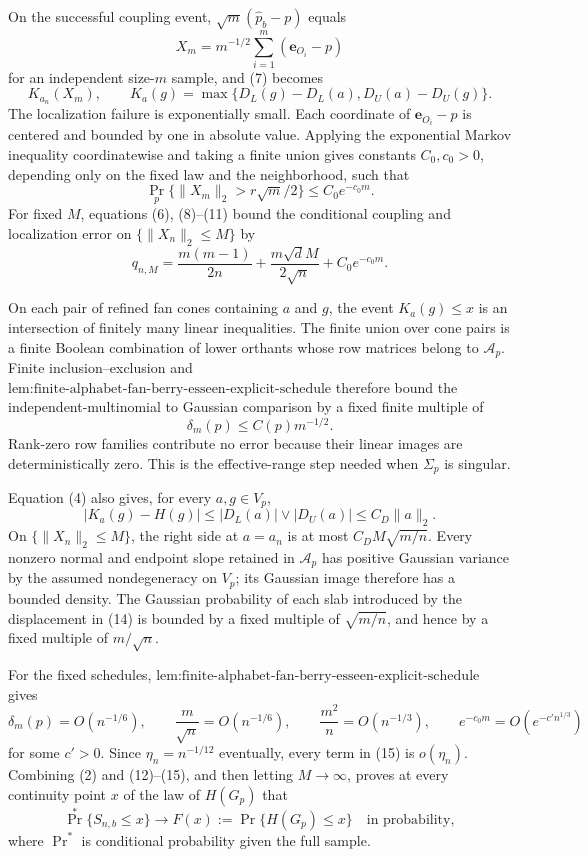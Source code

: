 On the successful coupling event, \(\sqrt m(\widehat p_b-p)\) equals
\[
X_m=m^{-1/2}\sum_{i=1}^m(\mathbf e_{O_i}-p)
\]
for an independent size-\(m\) sample, and (7) becomes
\[
K_{a_n}(X_m),
\qquad
K_a(g)=\max\{D_L(g)-D_L(a),D_U(a)-D_U(g)\}.
\tag{10}
\]
The localization failure is exponentially small. Each coordinate of \(\mathbf e_{O_i}-p\) is centered and bounded by one in absolute value. Applying the exponential Markov inequality coordinatewise and taking a finite union gives constants \(C_0,c_0>0\), depending only on the fixed law and the neighborhood, such that
\[
\Pr_p\{\|X_m\|_2>r\sqrt m/2\}\leq C_0e^{-c_0m}.
\tag{11}
\]
For fixed \(M\), equations (6), (8)--(11) bound the conditional coupling and localization error on \(\{\|X_n\|_2\leq M\}\) by
\[
q_{n,M}=\frac{m(m-1)}{2n}
+\frac{m\sqrt d M}{2\sqrt n}+C_0e^{-c_0m}.
\tag{12}
\]

On each pair of refined fan cones containing \(a\) and \(g\), the event \(K_a(g)\leq x\) is an intersection of finitely many linear inequalities. The finite union over cone pairs is a finite Boolean combination of lower orthants whose row matrices belong to \(\mathcal A_p\). Finite inclusion--exclusion and \(\text{lem:finite-alphabet-fan-berry-esseen-explicit-schedule}\) therefore bound the independent-multinomial to Gaussian comparison by a fixed finite multiple of
\[
\delta_m(p)\leq C(p)m^{-1/2}.
\tag{13}
\]
Rank-zero row families contribute no error because their linear images are deterministically zero. This is the effective-range step needed when \(\Sigma_p\) is singular.

Equation (4) also gives, for every \(a,g\in V_p\),
\[
|K_a(g)-H(g)|
\leq |D_L(a)|\vee|D_U(a)|
\leq C_D\|a\|_2.
\tag{14}
\]
On \(\{\|X_n\|_2\leq M\}\), the right side at \(a=a_n\) is at most \(C_DM\sqrt{m/n}\). Every nonzero normal and endpoint slope retained in \(\mathcal A_p\) has positive Gaussian variance by the assumed nondegeneracy on \(V_p\); its Gaussian image therefore has a bounded density. The Gaussian probability of each slab introduced by the displacement in (14) is bounded by a fixed multiple of \(\sqrt{m/n}\), and hence by a fixed multiple of \(m/\sqrt n\).

For the fixed schedules, \(\text{lem:finite-alphabet-fan-berry-esseen-explicit-schedule}\) gives
\[
\delta_m(p)=O(n^{-1/6}),
\qquad
\frac m{\sqrt n}=O(n^{-1/6}),
\qquad
\frac{m^2}{n}=O(n^{-1/3}),
\qquad
e^{-c_0m}=O(e^{-c'n^{1/3}})
\tag{15}
\]
for some \(c'>0\). Since \(\eta_n=n^{-1/12}\) eventually, every term in (15) is \(o(\eta_n)\). Combining (2) and (12)--(15), and then letting \(M\to\infty\), proves at every continuity point \(x\) of the law of \(H(G_p)\) that
\[
\Pr^*\{S_{n,b}\leq x\}\longrightarrow
F(x):=\Pr\{H(G_p)\leq x\}
\quad\text{in probability},
\tag{16}
\]
where \(\Pr^*\) is conditional probability given the full sample.

